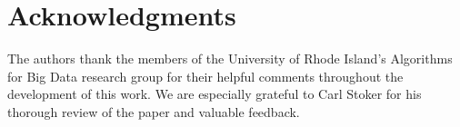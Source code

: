 \documentclass[acmsmall, review]{acmart}
\begin{document}
    
    
    
    
    

    \section*{Acknowledgments}
    The authors thank the members of the University of Rhode Island's Algorithms for Big Data research group for their helpful comments throughout the development of this work.
    We are especially grateful to Carl Stoker for his thorough review of the paper and valuable feedback. 

    \FloatBarrier
    
    
\end{document}
